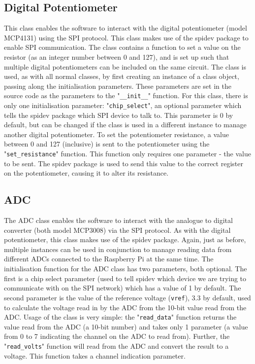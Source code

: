 \documentclass[twoside,a4]{report}
\def\br{\newline \newline \noindent}
\def\rpi{Raspberry Pi }
\begin{document}
	\subsection*{Digital Potentiometer} %
	This class enables the software to interact with the digital potentiometer (model MCP4131) using the SPI protocol. This class makes use of the spidev package to enable SPI communication. The class contains a function to set a value on the resistor (as an integer number between 0 and 127), and is set up such that multiple digital potentiometers can be included on the same circuit.\br
	The class is used, as with all normal classes, by first creating an instance of a class object, passing along the initialisation parameters. These parameters are set in the source code as the parameters to the "\texttt{\_\_init\_\_}" function. For this class, there is only one initialisation parameter: "\texttt{chip\_select}", an optional parameter which tells the spidev package which SPI device to talk to. This parameter is 0 by default, but can be changed if the class is used in a different instance to manage another digital potentiometer.\br
	To set the potentiometer resistance, a value between 0 and 127 (inclusive) is sent to the potentiometer using the "\texttt{set\_resistance}" function. This function only requires one parameter - the value to be sent. The spidev package is used to send this value to the correct register on the potentiometer, causing it to alter its resistance.
	
	\subsection*{ADC} %
	The ADC class enables the software to interact with the analogue to digital converter (both model MCP3008) via the SPI protocol. As with the digital potentiometer, this class makes use of the spidev package. Again, just as before, multiple instances can be used in conjunction to manage reading data from different ADCs connected to the \rpi at the same time. \br
	The initialisation function for the ADC class has two parameters, both optional. The first is a chip select parameter (used to tell spidev which device we are trying to communicate with on the SPI network) which has a value of 1 by default. The second parameter is the value of the reference voltage (\texttt{vref}), 3.3 by default, used to calculate the voltage read in by the ADC from the 10-bit value read from the ADC. \br
	Usage of the class is very simple: the "\texttt{read\_data}" function returns the value read from the ADC (a 10-bit number) and takes only 1 parameter (a value from 0 to 7 indicating the channel on the ADC to read from). Further, the "\texttt{read\_volts}" function will read from the ADC and convert the result to a voltage. This function takes a channel indication parameter.
	
\end{document}
